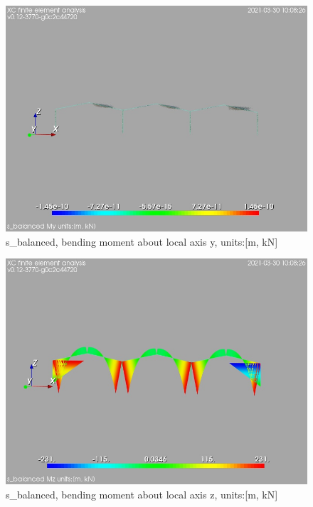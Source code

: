 \begin{figure}
\begin{center}
\includegraphics[width=\linewidth]{calc_results/sole_zeinali/text/graphics/resSimplLC/s_balancedallMemberSetMy}
\caption{s_balanced, bending moment about local axis y, units:[m, kN]}
\end{center}
\end{figure}
\begin{figure}
\begin{center}
\includegraphics[width=\linewidth]{calc_results/sole_zeinali/text/graphics/resSimplLC/s_balancedallMemberSetMz}
\caption{s_balanced, bending moment about local axis z, units:[m, kN]}
\end{center}
\end{figure}
